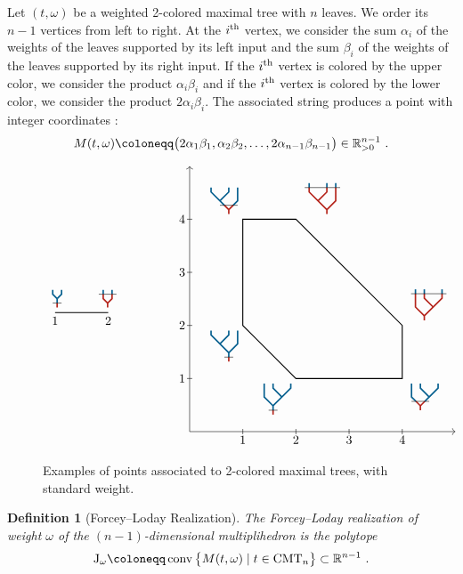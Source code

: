 \documentclass[twoside, 11pt]{amsart}
\newtheorem{definition}{Definition}[section]
\theoremstyle{remark}
\begin{document}
Let $(t, \omega)$ be a weighted 2-colored maximal tree with $n$ leaves. We order its $n-1$ vertices from left to right. At the $i^{\rm th}$ vertex, we consider the sum $\alpha_i$ of the weights of the leaves supported by its left input and 
 the sum $\beta_i$ of the weights of the leaves supported by its right input. 
If the $i^{\rm th}$ vertex is colored by the upper color, we consider the product $\alpha_i\beta_i$ and if the 
$i^{\rm th}$ vertex is colored by the lower color, we consider the product $2\alpha_i\beta_i$.
The associated string produces a point with integer coordinates :
\[M(t, \omega) \coloneqq \big(2\alpha_1\beta_1, \alpha_2\beta_2, \ldots, 2\alpha_{n-1}\beta_{n-1}\big)\in 
\RR_{>0}^{n-1}\ . \]
\begin{figure}[h!]
\[
\vcenter{\hbox{\begin{tikzpicture}[scale=1.5]
\draw[thick] (1,0)--(2,0);
\draw (1,0) node[above] {$\TreeBa$};
\draw (1.95,0) node[above] {$\TreeBb$};
\draw (1,0) node[below] {$1$};
\draw (2,0) node[below] {$2$};
\end{tikzpicture}}} \qquad \qquad
\vcenter{\hbox{
\begin{tikzpicture}[scale=1.5]
\draw (1,-0.05)--(1,0.05);
\draw (2,-0.05)--(2,0.05);
\draw (3,-0.05)--(3,0.05);
\draw (4,-0.05)--(4,0.05);
\draw (-0.05, 1)--(0.05,1);
\draw (-0.05, 2)--(0.05,2);
\draw (-0.05, 3)--(0.05,3);
\draw (-0.05, 4)--(0.05,4);
\draw[->] (0,0)--(5,0);
\draw[->] (0,0)--(0,5);
\draw (1,0) node[below] {$1$};
\draw (2,0) node[below] {$2$};
\draw (3,0) node[below] {$3$};
\draw (4,0) node[below] {$4$};
\draw (0,1) node[left] {$1$};
\draw (0,2) node[left] {$2$};
\draw (0,3) node[left] {$3$};
\draw (0,4) node[left] {$4$};
\draw[thick] (1,2)--(1,4)--(2,4)--(4,2)--(4,1)--(2,1)--cycle;
\draw (1,2) node[below left] {$\TreeLa$};
\draw (2,1) node[below left] {$\TreeRa$};
\draw (2,4) node[above right] {$\TreeLc$};
\draw (4,2) node[above right] {$\TreeRc$};
\draw (1,4) node[above left] {$\TreeLb$};
\draw (4,1) node[below right] {$\TreeRb$};
\end{tikzpicture}}}
\]
\caption{Examples of points associated to 2-colored maximal trees, with standard weight.}
\end{figure}


\begin{definition}[Forcey--Loday Realization] \label{def:ForceyLoday}
 The \emph{Forcey--Loday realization of weight $\omega$} of the $(n-1)$-dimensional multiplihedron is the  polytope
\[\J_\omega \coloneqq \conv \big\{M(t, \omega)\mid t\in \CMT{n} \big\}\subset \RR^{n-1}\ .\]
\end{definition}
\end{document}
